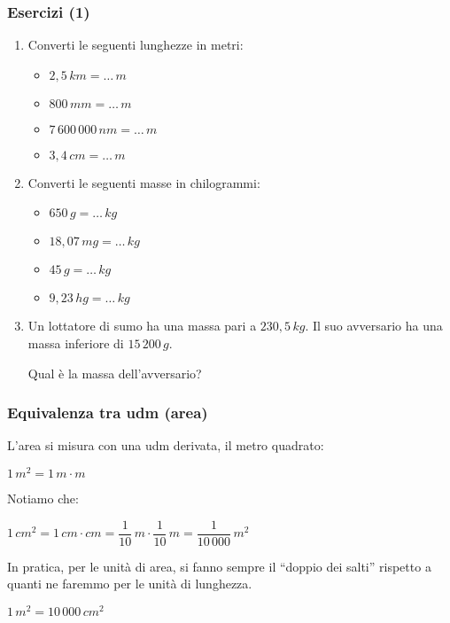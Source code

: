 \documentclass[]{beamer}
\begin{document}
\begin{frame}
\frametitle{Esercizi (1)}
\begin{enumerate}
  \item Converti le seguenti lunghezze in metri:
  \begin{multicols}{2}
    \begin{itemize}
        \item $ 2,5 \, km = \ldots \, m $
        \item $ 800 \, mm = \ldots \, m $
        \item $ 7\,600\,000 \, nm = \ldots \, m $
        \item $ 3,4 \, cm = \ldots \, m $
    \end{itemize}
  \end{multicols}
  \item Converti le seguenti masse in chilogrammi:
  \begin{multicols}{2}
    \begin{itemize}
        \item $ 650 \, g = \ldots \, kg $
        \item $ 18,07 \, mg = \ldots \, kg $
        \item $ 45 \, g = \ldots \, kg $
        \item $ 9,23 \, hg = \ldots \, kg $
    \end{itemize}
  \end{multicols}
  \item Un lottatore di sumo ha una massa pari a $ 230,5 \, kg $. Il suo avversario ha una massa inferiore di $ 15\,200 \, g $.
  
  Qual è la massa dell'avversario?
\end{enumerate}
\end{frame}



\begin{frame}
\frametitle{Equivalenza tra udm (area)}
L'area si misura con una udm derivata, il \alert<1>{metro quadrato}:
\begin{center}
$ 1 \, m^2 = 1 \, m \cdot m $
\end{center}\pause
Notiamo che:
\begin{center}
$ 1 \, cm^2 = 1 \, cm \cdot cm = \dfrac{1}{10} \, m \cdot \dfrac{1}{10} \, m  = \dfrac{1}{10\,000} \, m^2$
\end{center}\pause
In pratica, \alert<3>{per le unità di area, si fanno sempre il ``doppio dei salti''} rispetto a quanti ne faremmo per le unità di lunghezza.
\begin{center}
$ 1 \, m^2 = 10\,000 \, cm^2 $
\end{center}
\end{frame}
\end{document}
